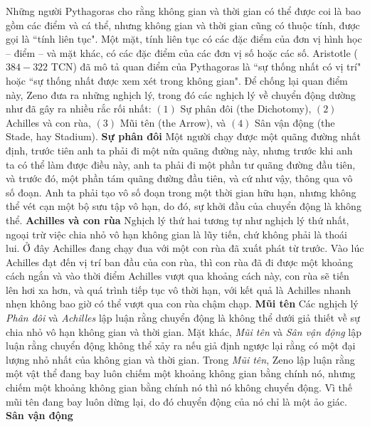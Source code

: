 \begin{multicols}{2}
	\vskip 0.1cm
	Những người Pythagoras cho rằng không gian và thời gian có thể được coi là bao gồm các điểm và cá thể, nhưng không gian và thời gian cũng có thuộc tính, được gọi là ``tính liên tục". 
	Một mặt, tính liên tục có các đặc điểm của đơn vị hình học -- điểm -- và mặt khác, có các đặc điểm của các đơn vị số hoặc các số.
	Aristotle ($384-322$ TCN) đã mô tả quan điểm của Pythagoras là ``sự thống nhất có vị trí" hoặc ``sự thống nhất được xem xét trong không gian". 
	Để chống lại quan điểm này, Zeno đưa ra những nghịch lý, trong đó các nghịch lý về chuyển động dường như đã gây ra nhiều rắc rối nhất:
	\vskip 0.1cm
	$(1)$ Sự phân đôi (the Dichotomy), 
	\vskip 0.1cm
	$(2)$ Achilles và con rùa, 
	\vskip 0.1cm
	$(3)$ Mũi tên (the Arrow), và 
	\vskip 0.1cm
	$(4)$ Sân vận động (the Stade, hay Stadium).
	\vskip 0.1cm
	\textbf{\color{lichsutoanhoc}Sự phân đôi}
	\vskip 0.1cm
	Một người chạy được một quãng đường nhất định, trước tiên anh ta phải đi một nửa quãng đường này, nhưng trước khi anh ta có thể làm được điều này, anh ta phải đi một phần tư quãng đường đầu tiên, và trước đó, một phần tám quãng đường đầu tiên, và cứ như vậy, thông qua vô số đoạn.  Anh ta phải tạo vô số đoạn trong một thời gian hữu hạn, nhưng không thể vét cạn một bộ sưu tập vô hạn, do đó, sự khởi đầu của chuyển động là không thể.
	\vskip 0.1cm
	\textbf{\color{lichsutoanhoc}Achilles và con rùa}
	\vskip 0.1cm
	Nghịch lý thứ hai tương tự như nghịch lý thứ nhất, ngoại trừ việc chia nhỏ vô hạn không gian là lũy tiến, chứ không phải là thoái lui. Ở đây Achilles đang chạy đua với một con rùa đã xuất phát từ trước. Vào lúc Achilles đạt đến vị trí ban đầu của con rùa, thì con rùa đã đi được một khoảng cách ngắn và vào thời điểm Achilles vượt qua khoảng cách này, con rùa sẽ tiến lên hơi xa hơn, và quá trình tiếp tục vô thời hạn, với kết quả là Achilles nhanh nhẹn không bao giờ có thể vượt qua con rùa chậm chạp.
	\vskip 0.1cm
	\textbf{\color{lichsutoanhoc}Mũi tên}
	\vskip 0.05cm
	Các nghịch lý \textit{Phân đôi} và \textit{Achilles} lập luận rằng chuyển động là không thể dưới giả thiết về sự chia nhỏ vô hạn không gian và thời gian. Mặt khác, \textit{Mũi tên} và \textit{Sân vận động} lập luận rằng chuyển động không thể xảy ra nếu giả định ngược lại rằng có một đại lượng nhỏ nhất của không gian và thời gian. Trong \textit{Mũi tên}, Zeno lập luận rằng một vật thể đang bay luôn chiếm một khoảng không gian bằng chính nó, nhưng chiếm một khoảng không gian bằng chính nó thì nó không chuyển động. Vì thế mũi tên đang bay luôn dừng lại, do đó chuyển động của nó chỉ là một ảo giác.
	\vskip 0.05cm
	\textbf{\color{lichsutoanhoc}Sân vận động}

\end{multicols}
